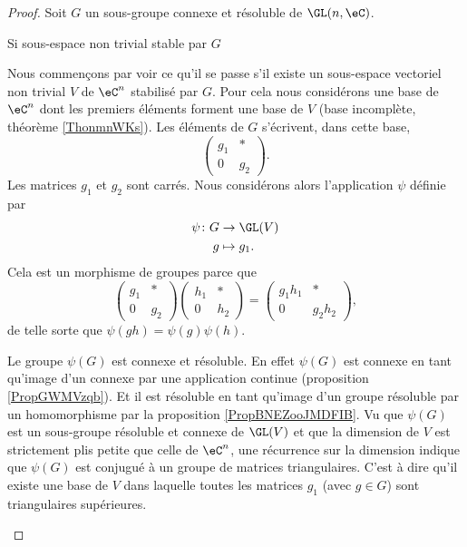 \begin{proof}
    Soit \( G\) un sous-groupe connexe et résoluble de \( \GL(n,\eC)\).
    
    \begin{subproof}
        \item[Si sous-espace non trivial stable par \( G\)]

    Nous commençons par voir ce qu'il se passe s'il existe un sous-espace vectoriel non trivial \( V\) de \( \eC^n\) stabilisé par \( G\). Pour cela nous considérons une base de \( \eC^n\) dont les premiers éléments forment une base de \( V\) (base incomplète, théorème \ref{ThonmnWKs}). Les éléments de \( G\) s'écrivent, dans cette base,
    \begin{equation}    \label{EqGOKTooEaGACG}
        \begin{pmatrix}
            g_1    &   *    \\ 
            0    &   g_2    
        \end{pmatrix}.
    \end{equation}
    Les matrices \( g_1\) et \( g_2\) sont carrés. Nous considérons alors l'application \( \psi\) définie par
    \begin{equation}
        \begin{aligned}
            \psi\colon G&\to \GL(V) \\
            g&\mapsto g_1.
        \end{aligned}
    \end{equation}
    Cela est un morphisme de groupes parce que
    \begin{equation}
        \begin{pmatrix}
            g_1    &   *    \\ 
            0    &   g_2    
        \end{pmatrix}\begin{pmatrix}
            h_1    &   *    \\ 
            0    &   h_2    
        \end{pmatrix}=
        \begin{pmatrix}
            g_1h_1    &   *    \\ 
            0    &   g_2h_2    
        \end{pmatrix},
    \end{equation}
    de telle sorte que \( \psi(gh)=\psi(g)\psi(h)\).

    Le groupe \( \psi(G)\) est connexe et résoluble. En effet \( \psi(G)\) est connexe en tant qu'image d'un connexe par une application continue (proposition \ref{PropGWMVzqb}). Et il est résoluble en tant qu'image d'un groupe résoluble par un homomorphisme par la proposition \ref{PropBNEZooJMDFIB}. Vu que \( \psi(G)\) est un sous-groupe résoluble et connexe de \( \GL(V)\) et que la dimension de \( V\) est strictement plis petite que celle de \( \eC^n\), une récurrence sur la dimension indique que \( \psi(G)\) est conjugué à un groupe de matrices triangulaires. C'est à dire qu'il existe une base de \( V\) dans laquelle toutes les matrices \( g_1\) (avec \( g\in G\)) sont triangulaires supérieures.


\end{subproof}
\end{proof}
